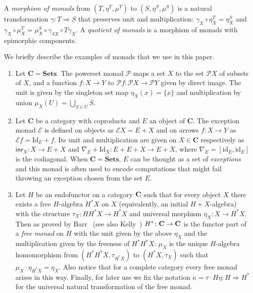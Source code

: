 \documentclass[oribibl,envcountsame,envcountsect,runningheads]{llncs}
\newcommand{\Pow}{\mathcal{P}}
\newcommand{\cat}[1]{\ensuremath{\mathbf{#1}}}
\newcommand{\Cat}[1]{\ensuremath{\mathbf{#1}}}
\newcommand{\Sets}{\Cat{Sets}}
\newcommand{\free}[1]{{#1^*}}
\renewcommand{\>}{\rangle}
\def\id{\mathrm{id}}
\def\Id{\mathrm{Id}}
\def\inr{\mathsf{inr}}
\def\To{\Rightarrow}
\begin{document}
A \emph{morphism of monads} from $(T,\eta^T, \mu^T)$ to $(S,\eta^S, \mu^S)$ is a natural transformation $\gamma \colon T \Rightarrow S$ that preserves unit and multiplication: $\gamma_X \circ \eta^T_X=\eta^S_X$ and $\gamma_X \circ \mu^T_X=\mu_X^S \circ \gamma_{SX} \circ T\gamma_X$. A \emph{quotient of monads} is a morphism of monads with epimorphic components.



\begin{example}\label{ex:mnds}
We briefly describe the examples of monads that
we use in this paper.
\begin{enumerate}\item \label{pt:powersetmonad} Let $\cat{C}=\Sets$. The powerset monad $\Pow$ maps a set $X$ to the set $\Pow X$ of
  subsets of $X$, and a function $f\colon X \to Y$ to $\Pow  f\colon
  \Pow X \to \Pow Y$ given by direct image. The unit is given by the
  singleton set map $\eta_X(x) = \{x\}$ and multiplication by union
  $\mu_X(U) = \bigcup_{S \in U} S$.

\item \label{pt:exceptionmonad}  Let $\cat{C}$ be a category with coproducts and $E$ an object of $\cat C$. The exception monad $\mathcal E$ is defined on objects as $\mathcal E  X = E + X$
and on arrows $f\colon X\to Y$ as $\mathcal E   f = \Id_E + f$. Its unit and multiplication are given on $X \in \cat C$ respectively as $\inr_X\colon X \to E + X$ and $\nabla_{E} + \Id_X : E + E + X\to E + X$, where $\nabla_E = [\id_E,\id_E]$ is the codiagonal. When $\cat C=\Sets$, $E$ can be thought as a set of {\em exceptions} and this monad is often used to encode computations that might fail throwing an exception chosen from the set $E$.

\item \label{pt:freemonad} Let $H$ be an endofunctor on a category $\C$ such that for every
  object $X$ there exists a free $H$-algebra $\free{H}X$ on $X$
  (equivalently, an initial
  $H+X$-algebra) with the structure $\tau_X: H\free{H} X \to \free{H}X$ and
  universal morphism $\eta_X: X \to \free{H} X$. Then as proved by Barr~\cite{barr:70} (see also
  Kelly~\cite{kelly:80}) $\free{H}\colon \C \to \C$ is the functor part of a \emph{free
  monad} on $H$ with the unit given by the above $\eta_X$ and the
  multiplication given by the freeness of $\free{H}\free{H}X$: $\mu_X$ is the
  unique $H$-algebra homomorphism from $(\free{H}\free{H}X, \tau_{\free{H}X})$ to
  $(\free{H}X , \tau_X)$ such that $\mu_X \cdot \eta_{\free{H}X} = \eta_X$.
  Also notice that for a complete category every free monad
  arises in this way. Finally, for later use we fix the notation $\kappa = \tau
  \cdot H\eta\colon H \To \free{H}$ for the universal natural transformation of the free monad.
\end{enumerate}
\end{example}
\end{document}
